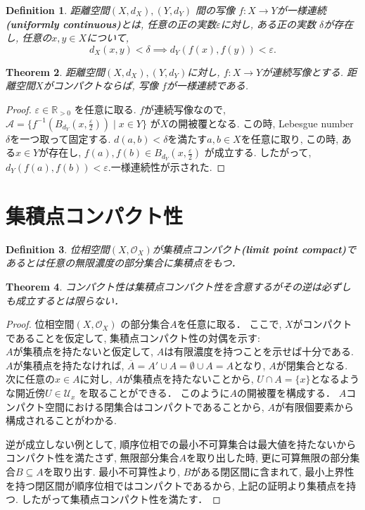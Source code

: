 \documentclass[lualatex]{ltjsbook}
\newcommand{\cl}[1]{\overline{ #1}  }
\newtheorem{theorem}{Theorem}[chapter]
\newtheorem{definition}[theorem]{Definition}
\theoremstyle{remark}
\theoremstyle{plain}
\begin{document}
\begin{definition}
	距離空間$\left( X, d_X \right) ,  \left( Y,  d_Y \right) $ 間の写像
	$f:X \to Y$が一様連続\textbf{(uniformly continuous)}とは,  
	任意の正の実数$\varepsilon$に対し,  
	ある正の実数 $\delta$が存在し, 
	任意の$x, y \in X$について,  
	 \[
	 d_X(x, y) < \delta \implies d_Y(f(x), f(y))<\varepsilon
	 .\] 
\end{definition}

\begin{theorem}
	距離空間$\left( X, d_X \right) , (Y, d_Y)$に対し,  $f: X \to Y$が連続写像とする. 距離空間$X$がコンパクトならば,  写像 $f$が一様連続である.		
\end{theorem}

\begin{proof}
$\varepsilon \in \mathbb{R}_{>0}$ を任意に取る.
$f$が連続写像なので, 
$\mathcal{A}=\{f^{-1}\left(B_{d_Y}(x ,  \frac{\varepsilon}{2})\right)  \mid x \in Y\} $ 
が$X$の開被覆となる. 
この時,  Lebesgue number  $\delta$を一つ取って固定する. 
$d\left( a, b \right) < \delta $を満たす$a, b \in X$を任意に取り,  
この時,  ある$x \in Y$が存在し,   
$f(a), f(b) \in B_{d_Y}(x,  \frac{\varepsilon}{2})$ が成立する. 
したがって,  $d_Y(f(a), f(b)) < \varepsilon$.一様連続性が示された.
\end{proof}

\section{集積点コンパクト性}

\begin{definition}
	位相空間$\left( X ,  \mathcal{O}_{X} \right)$が集積点コンパクト\textbf{(limit point compact)}であるとは任意の無限濃度の部分集合に集積点をもつ．
\end{definition}

\begin{theorem}
	コンパクト性は集積点コンパクト性を含意するがその逆は必ずしも成立するとは限らない．
\end{theorem}

\begin{proof}
	位相空間$\left( X ,  \mathcal{O}_{X} \right)$ の部分集合$A$を任意に取る．
	ここで,   $X$がコンパクトであることを仮定して,  集積点コンパクト性の対偶を示す: \\
	 $A$が集積点を持たないと仮定して,   $A$は有限濃度を持つことを示せば十分である.
	 $A$が集積点を持たなければ,   $\cl{A} = A ' \cup  A = \emptyset \cup A =A$となり,  $A$が閉集合となる. 次に任意の$x \in A$に対し,   $A$が集積点を持たないことから,   $U \cap A = \{x\} $となるような開近傍$U \in \mathcal{U}_x$ を取ることができる．
	 このように$A$の開被覆を構成する． $A$コンパクト空間における閉集合はコンパクトであることから,   $A$が有限個要素から構成されることがわかる.

	 逆が成立しない例として,  順序位相での最小不可算集合は最大値を持たないからコンパクト性を満たさず,  無限部分集合$A$を取り出した時,  更に可算無限の部分集合$B \subseteq A$を取り出す. 最小不可算性より,  $B$がある閉区間に含まれて,  最小上界性を持つ閉区間が順序位相ではコンパクトであるから,  上記の証明より集積点を持つ. したがって集積点コンパクト性を満たす．
\end{proof}
\end{document}
